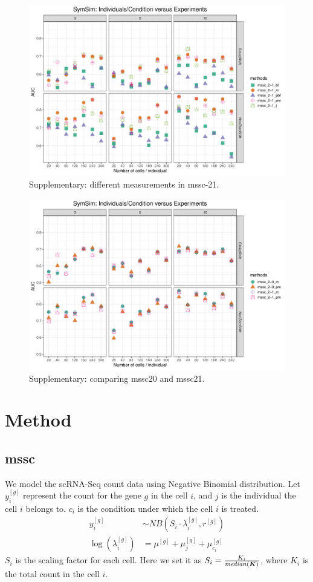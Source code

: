 \documentclass[fleqn,10pt]{wlscirep}
\newcommand{\myvec}[1]{\boldsymbol{#1}}
\newcommand{\mymucond}{\mu_{c_i}}
\begin{document}
\begin{figure}[H]
  \centering
  \includegraphics[width=\textwidth]{SymSim_mssc21_Summarize}
  \caption{Supplementary: different measurements in mssc-21.}
\end{figure}

\begin{figure}[H]
  \centering
  \includegraphics[width=\textwidth]{SymSim_mssc-20vs21_Summarize}
  \caption{Supplementary: comparing mssc20 and mssc21.}
\end{figure}

\section*{Method}
\subsection*{mssc}
We model the scRNA-Seq count data using Negative Binomial distribution. Let
\(y_i^{[g]}\) represent the count for the gene \(g\) in the cell \(i\), and \(j\)
is the individual the cell \(i\) belongs to. \(c_i\) is the condition under which
the cell \(i\) is treated.
\begin{align*}
  y_i^{[g]} &\sim NB(S_i\cdot\lambda_i^{[g]}, r^{[g]}) \\
  \log(\lambda_i^{[g]}) &= \mu^{[g]} + \mu_j^{[g]} + \mymucond^{[g]}
\end{align*}
\(S_i\) is the scaling factor for each cell. 
Here we set it as \(S_i = \frac{K_i}{{\it median}(\myvec{K})}\), where
\(K_i\) is the total count in the 
cell \(i\).\\
\end{document}
